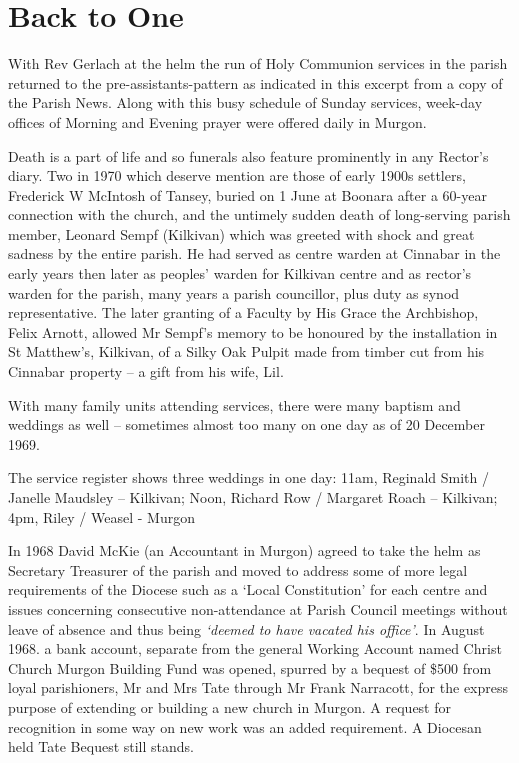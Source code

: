 \section{Back to One}



With Rev Gerlach at the helm the run of Holy Communion services in the parish returned to the pre-assistants-pattern as indicated in this excerpt from a copy of the Parish News. Along with this busy schedule of Sunday services, week-day offices of Morning and Evening prayer were offered daily in Murgon.



Death is a part of life and so funerals also feature prominently in any Rector's diary. Two in 1970 which deserve mention are those of early 1900s settlers, Frederick W McIntosh of Tansey, buried on 1 June at Boonara after a 60-year connection with the church, and the untimely sudden death of long-serving parish member, Leonard Sempf (Kilkivan) which was greeted with shock and great sadness by the entire parish. He had served as centre warden at Cinnabar in the early years then later as peoples' warden for Kilkivan centre and as rector's warden for the parish, many years a parish councillor, plus duty as synod representative. The later granting of a Faculty by His Grace the Archbishop, Felix Arnott, allowed Mr Sempf's memory to be honoured by the installation in St Matthew's, Kilkivan, of a Silky Oak Pulpit made from timber cut from his Cinnabar property -- a gift from his wife, Lil.



With many family units attending services, there were many baptism and weddings as well -- sometimes almost too many on one day as of 20 December 1969.



The service register shows three weddings in one day: 11am, Reginald Smith / Janelle Maudsley -- Kilkivan; Noon, Richard Row / Margaret Roach -- Kilkivan; 4pm, Riley / Weasel - Murgon



In 1968 David McKie (an Accountant in Murgon) agreed to take the helm as Secretary Treasurer of the parish and moved to address some of more legal requirements of the Diocese such as a `Local Constitution' for each centre and issues concerning consecutive non-attendance at Parish Council meetings without leave of absence and thus being \emph{`deemed to have vacated his office'}. In August 1968. a bank account, separate from the general Working Account named Christ Church Murgon Building Fund was opened, spurred by a bequest of \$500 from loyal parishioners, Mr and Mrs Tate through Mr Frank Narracott, for the express purpose of extending or building a new church in Murgon. A request for recognition in some way on new work was an added requirement. A Diocesan held Tate Bequest still stands.



